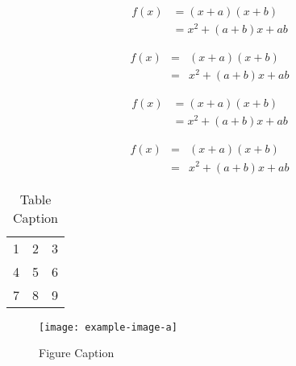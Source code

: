 \documentclass[preprint,12pt]{elsarticle}
\begin{document}
\begin{align}
 f(x) &= (x+a)(x+b) \\
      &= x^2 + (a+b)x + ab
\end{align}

\begin{eqnarray}
 f(x) &=& (x+a)(x+b) \nonumber\\ %
      &=& x^2 + (a+b)x + ab
\end{eqnarray}

\begin{align*}
 f(x) &= (x+a)(x+b) \\
      &= x^2 + (a+b)x + ab
\end{align*}

\begin{eqnarray*}
 f(x)&=& (x+a)(x+b) \\
     &=& x^2 + (a+b)x + ab
\end{eqnarray*}


\begin{table}[t]%
\centering%
\begin{tabular}{l c r}%
  1 & 2 & 3 \\ %
  4 & 5 & 6 \\
  7 & 8 & 9 \\
\end{tabular}
\caption{Table Caption}\label{fig1}
\end{table}


\begin{figure}[t]%
\centering%
\texttt{[image: example-image-a]}
\caption{Figure Caption}\label{fig1}
\end{figure}
\end{document}
